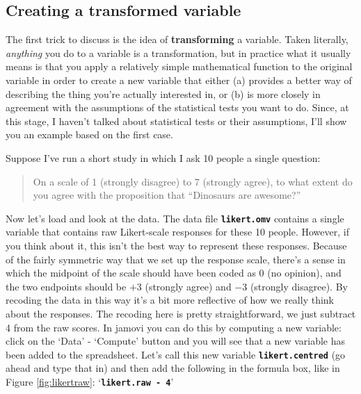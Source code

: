 \documentclass[
]{book}
\begin{document}
\hypertarget{creating-a-transformed-variable}{%
\subsection{Creating a transformed variable}\label{creating-a-transformed-variable}}

The first trick to discuss is the idea of {\textbf{transforming}} a variable. Taken literally, \emph{anything} you do to a variable is a transformation, but in practice what it usually means is that you apply a relatively simple mathematical function to the original variable in order to create a new variable that either (a) provides a better way of describing the thing you're actually interested in, or (b) is more closely in agreement with the assumptions of the statistical tests you want to do. Since, at this stage, I haven't talked about statistical tests or their assumptions, I'll show you an example based on the first case.

Suppose I've run a short study in which I ask 10 people a single question:

\begin{quote}
On a scale of 1 (strongly disagree) to 7 (strongly agree), to what extent do you agree with the proposition that ``Dinosaurs are awesome?''
\end{quote}

Now let's load and look at the data. The data file \textbf{\texttt{likert.omv}} contains a single variable that contains raw Likert-scale responses for these 10 people. However, if you think about it, this isn't the best way to represent these responses. Because of the fairly symmetric way that we set up the response scale, there's a sense in which the midpoint of the scale should have been coded as 0 (no opinion), and the two endpoints should be \(+3\) (strongly agree) and \(-3\) (strongly disagree). By recoding the data in this way it's a bit more reflective of how we really think about the responses. The recoding here is pretty straightforward, we just subtract 4 from the raw scores. In jamovi you can do this by computing a new variable: click on the `Data' - `Compute' button and you will see that a new variable has been added to the spreadsheet. Let's call this new variable \textbf{\texttt{likert.centred}} (go ahead and type that in) and then add the following in the formula box, like in Figure \ref{fig:likertraw}: `\textbf{\texttt{likert.raw\ -\ 4}}'
\end{document}
